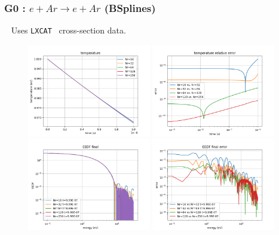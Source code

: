 \documentclass[mathserif, aspectratio=169]{beamer}
\newcommand{\lxcat}{\texttt{LXCAT}}
\begin{document}
	\begin{frame}
		\frametitle{G0 : $e + Ar \rightarrow e + Ar$ (BSplines)}
		\textbullet~ Uses \lxcat~ cross-section data. 
		\begin{figure}
			\only<+>
			{
				\includegraphics[width=0.48\textwidth]{g0_bs_temp.png}
				\includegraphics[width=0.48\textwidth]{g0_bs_temp_error.png}
			}
			\only<+>
			{
				\includegraphics[width=0.48\textwidth]{g0_bs_eedf_final.png}
				\includegraphics[width=0.48\textwidth]{g0_bs_eedf_final_error.png}
			}
		\end{figure}
	\end{frame}
\end{document}
